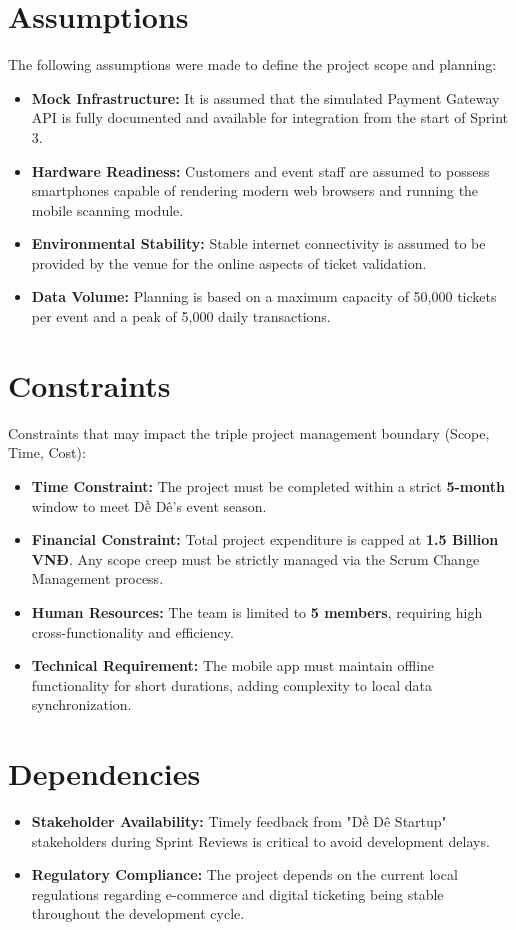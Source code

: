 \section{Assumptions}
The following assumptions were made to define the project scope and planning:
\begin{itemize}
    \item \textbf{Mock Infrastructure:} It is assumed that the simulated Payment Gateway API is fully documented and available for integration from the start of Sprint 3.
    \item \textbf{Hardware Readiness:} Customers and event staff are assumed to possess smartphones capable of rendering modern web browsers and running the mobile scanning module.
    \item \textbf{Environmental Stability:} Stable internet connectivity is assumed to be provided by the venue for the online aspects of ticket validation.
    \item \textbf{Data Volume:} Planning is based on a maximum capacity of 50,000 tickets per event and a peak of 5,000 daily transactions.
\end{itemize}

\section{Constraints}
Constraints that may impact the triple project management boundary (Scope, Time, Cost):
\begin{itemize}
    \item \textbf{Time Constraint:} The project must be completed within a strict \textbf{5-month} window to meet Dề Dê's event season.
    \item \textbf{Financial Constraint:} Total project expenditure is capped at \textbf{1.5 Billion VNĐ}. Any scope creep must be strictly managed via the Scrum Change Management process.
    \item \textbf{Human Resources:} The team is limited to \textbf{5 members}, requiring high cross-functionality and efficiency.
    \item \textbf{Technical Requirement:} The mobile app must maintain offline functionality for short durations, adding complexity to local data synchronization.
\end{itemize}

\section{Dependencies}
\begin{itemize}
    \item \textbf{Stakeholder Availability:} Timely feedback from "Dề Dê Startup" stakeholders during Sprint Reviews is critical to avoid development delays.
    \item \textbf{Regulatory Compliance:} The project depends on the current local regulations regarding e-commerce and digital ticketing being stable throughout the development cycle.
\end{itemize}

